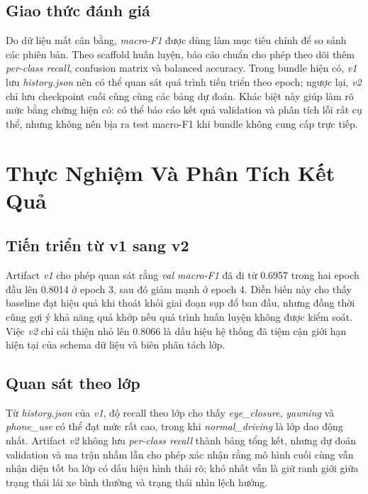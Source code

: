 \documentclass[conference,a4paper]{IEEEtran}
\begin{document}
\subsection{Giao thức đánh giá}
Do dữ liệu mất cân bằng, \textit{macro-F1} được dùng làm mục tiêu chính để so sánh các phiên bản. Theo scaffold huấn luyện, báo cáo chuẩn cho phép theo dõi thêm \textit{per-class recall}, confusion matrix và balanced accuracy. Trong bundle hiện có, \textit{v1} lưu \textit{history.json} nên có thể quan sát quá trình tiến triển theo epoch; ngược lại, \textit{v2} chỉ lưu checkpoint cuối cùng cùng các bảng dự đoán. Khác biệt này giúp làm rõ mức bằng chứng hiện có: có thể báo cáo kết quả validation và phân tích lỗi rất cụ thể, nhưng không nên bịa ra test macro-F1 khi bundle không cung cấp trực tiếp.

\section[Thuc Nghiem Va Phan Tich Ket Qua]{Thực Nghiệm Và Phân Tích Kết Quả}
\subsection{Tiến triển từ v1 sang v2}
Artifact \textit{v1} cho phép quan sát rằng \textit{val macro-F1} đã đi từ 0.6957 trong hai epoch đầu lên 0.8014 ở epoch 3, sau đó giảm mạnh ở epoch 4. Diễn biến này cho thấy baseline đạt hiệu quả khi thoát khỏi giai đoạn sụp đổ ban đầu, nhưng đồng thời cũng gợi ý khả năng quá khớp nếu quá trình huấn luyện không được kiểm soát. Việc \textit{v2} chỉ cải thiện nhỏ lên 0.8066 là dấu hiệu hệ thống đã tiệm cận giới hạn hiện tại của schema dữ liệu và biên phân tách lớp.

\subsection{Quan sát theo lớp}
Từ \textit{history.json} của \textit{v1}, độ recall theo lớp cho thấy \textit{eye\_closure}, \textit{yawning} và \textit{phone\_use} có thể đạt mức rất cao, trong khi \textit{normal\_driving} là lớp dao động nhất. Artifact \textit{v2} không lưu \textit{per-class recall} thành bảng tổng kết, nhưng dự đoán validation và ma trận nhầm lẫn cho phép xác nhận rằng mô hình cuối cùng vẫn nhận diện tốt ba lớp có dấu hiệu hình thái rõ; khó nhất vẫn là giữ ranh giới giữa trạng thái lái xe bình thường và trạng thái nhìn lệch hướng.
\end{document}
